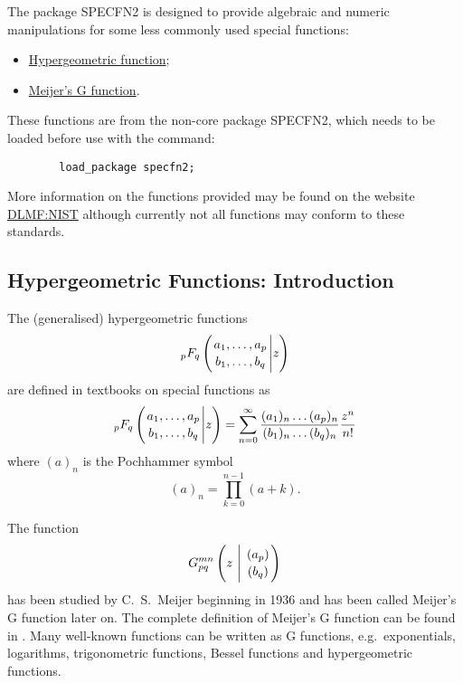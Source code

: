 \hypertarget{SPECFNS2}{}

The package SPECFN2 is designed to provide algebraic and numeric manipulations
for some less commonly used special functions:
\begin{itemize}
\item \hyperlink{operator:HYPERGEOMETRIC}{Hypergeometric function};
\item \hyperlink{operator:MEIJERG}{Meijer's G function}.
\end{itemize}

These functions are from the non-core package SPECFN2, which
needs to be loaded before use with the command:
\begin{verbatim}
        load_package specfn2;
\end{verbatim}

More information on the functions provided may be found on the website
\href{https://dlmf.nist.gov/}{DLMF:NIST} although currently not all functions
may conform to these standards.

\subsection{Hypergeometric Functions: Introduction}
The (generalised) hypergeometric functions
\begin{displaymath}
_pF_q \left( \genfrac{}{}{0pt}{}{a_1, \ldots , a_p}{b_1, \ldots ,b_q} \Bigg\vert z \right)
\end{displaymath}
are defined in textbooks on special functions as
\begin{displaymath}
_pF_q \left( \genfrac{}{}{0pt}{}{a_1, \ldots , a_p}{b_1, \ldots ,b_q} \Bigg\vert z \right)
  = \sum_{n=0}^{\infty}\frac{(a_{1})_{n}\dots(a_{p})_{n}}{(b_{1})_{n}\dots(b_{q})_{n}}\frac{z^{n}}{n!}
\end{displaymath}
where $(a)_{n}$ is the Pochhammer symbol
\begin{displaymath}
 (a)_{n} = \prod_{k=0}^{n-1} (a+k).
\end{displaymath}

The function 
\begin{displaymath}
G_{p q}^{m n} \left( z \  \Bigg\vert \  \genfrac{}{}{0pt}{}{(a_p)}{(b_q)} \right)
\end{displaymath}
has been studied by C.~S.~Meijer beginning in 1936 and has been
called Meijer's G function later on. The complete definition of Meijer's
G function can be found in \cite{Prudnikov:90c}.
Many well-known functions can be written as G functions,
e.g.\ exponentials, logarithms, trigonometric functions, Bessel functions
and hypergeometric functions.

